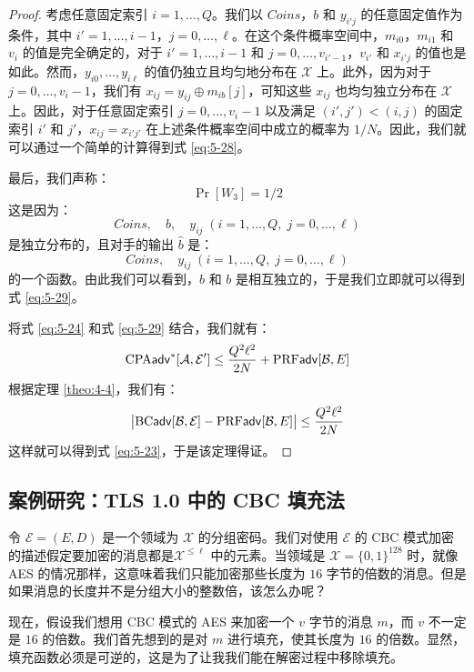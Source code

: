 \begin{proof}
考虑任意固定索引 $i=1,\dots,Q$。我们以 $Coins$，$b$ 和 $y_{i'j}$ 的任意固定值作为条件，其中 $i'=1,\dots,i-1$，$j=0,\dots,\ell$。在这个条件概率空间中，$m_{i0}$，$m_{i1}$ 和 $v_i$ 的值是完全确定的，对于 $i'=1,\dots,i-1$ 和 $j=0,\dots,v_{i'-1}$，$v_{i'}$ 和 $x_{i'j}$ 的值也是如此。然而，$y_{i0},\dots,y_{i\ell}$ 的值仍独立且均匀地分布在 $\mathcal{X}$ 上。此外，因为对于 $j=0,\dots,v_i-1$，我们有 $x_{ij}=y_{ij}\oplus m_{ib}[j]$，可知这些 $x_{ij}$ 也均匀独立分布在 $\mathcal{X}$ 上。因此，对于任意固定索引 $j=0,\dots,v_i-1$ 以及满足 $(i',j')<(i,j)$ 的固定索引 $i'$ 和 $j'$，$x_{ij}=x_{i'j'}$ 在上述条件概率空间中成立的概率为 ${1}/{N}$。因此，我们就可以通过一个简单的计算得到式 \ref{eq:5-28}。

最后，我们声称：
\begin{equation}\label{eq:5-29}
\Pr[W_3]={1}/{2}
\end{equation}
这是因为：
\[
Coins,\quad
b,\quad
y_{ij}\;(i=1,\dots,Q,\;j=0,\dots,\ell)
\]
是独立分布的，且对手的输出 $\hat{b}$ 是：
\[
Coins,\quad
y_{ij}\;(i=1,\dots,Q,\;j=0,\dots,\ell)
\]
的一个函数。由此我们可以看到，$\hat b$ 和 $b$ 是相互独立的，于是我们立即就可以得到式 \ref{eq:5-29}。

将式 \ref{eq:5-24} 和式 \ref{eq:5-29} 结合，我们就有：
\[
{\rm CPA}\mathsf{adv}^*[\mathcal{A}, \mathcal{E}']\leq\frac{Q^2\ell^2}{2N}+{\rm PRF\mathsf{adv}}[\mathcal{B},E]
\]
根据定理 \ref{theo:4-4}，我们有：
\[
\big\lvert
{\rm BC\mathsf{adv}}[\mathcal{B},\mathcal{E}]-{\rm PRF\mathsf{adv}}[\mathcal{B},E]
\big\rvert
\leq\frac{Q^2\ell^2}{2N}
\]
这样就可以得到式 \ref{eq:5-23}，于是该定理得证。
\end{proof}

\subsection{案例研究：TLS 1.0 中的 CBC 填充法}\label{subsec:5-4-4}

令 $\mathcal{E}=(E,D)$ 是一个领域为 $\mathcal{X}$ 的分组密码。我们对使用 $\mathcal{E}$ 的 CBC 模式加密的描述假定要加密的消息都是$\mathcal{X}^{\leq\ell}$ 中的元素。当领域是 $\mathcal{X}=\{0,1\}^{128}$ 时，就像 AES 的情况那样，这意味着我们只能加密那些长度为 $16$ 字节的倍数的消息。但是如果消息的长度并不是分组大小的整数倍，该怎么办呢？

现在，假设我们想用 CBC 模式的 AES 来加密一个 $v$ 字节的消息 $m$，而 $v$ 不一定是 $16$ 的倍数。我们首先想到的是对 $m$ 进行填充，使其长度为 $16$ 的倍数。显然，填充函数必须是可逆的，这是为了让我我们能在解密过程中移除填充。


